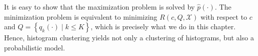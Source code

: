 It is easy to show that the maximization problem is solved by $\hat{p}(\cdot)$. The minimization problem is equivalent to minimizing $R(c,Q, \mathcal{X})$ with respect to $c$ and $Q = \left\{q_k(\cdot) \mid k \leq K\right\}$, which is precisely what we do in this chapter. Hence, histogram clustering yields not only a clustering of histograms, but also a probabilistic model.